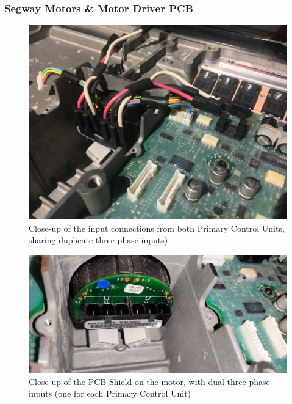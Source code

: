 \documentclass[]{formalLabReport}
\begin{document}
\subsubsection{Segway Motors \& Motor Driver PCB}

\begin{figure}
    \includegraphics[]{segwayMotorConnections.jpg}
    \caption{Close-up of the input connections from both Primary Control Units, sharing duplicate three-phase inputs)}
    \label{fig:segwayMotorConnections.jpg}
\end{figure}

\begin{figure}
    \includegraphics[]{segwayMotorInternal.jpg}
    \caption{Close-up of the PCB Shield on the motor, with dual three-phase inputs (one for each Primary Control Unit)}
    \label{fig:segwayMotorInternal.jpg}
\end{figure}
\end{document}
